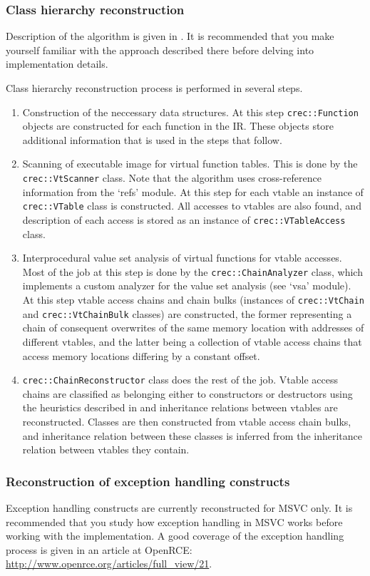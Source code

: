 \documentclass[a4paper,12pt]{article}
\newcommand{\ident}[1]{\texttt{#1}}
\begin{document}
\subsubsection{Class hierarchy reconstruction}
Description of the algorithm is given in \cite{fokin2010}. It is recommended that you make yourself familiar with the approach described there before delving into implementation details.

Class hierarchy reconstruction process is performed in several steps.
\begin{enumerate}
\item Construction of the neccessary data structures. At this step \ident{crec::Function} objects are constructed for each function in the IR. 
	These objects store additional information that is used in the steps that follow.
\item Scanning of executable image for virtual function tables. This is done by the \ident{crec::VtScanner} class. Note that the algorithm uses cross-reference information from the `refs' module. 
	At this step for each vtable an instance of \ident{crec::VTable} class is constructed. All accesses to vtables are also found, and description of each access is stored as an instance of \ident{crec::VTableAccess} class.
\item Interprocedural value set analysis of virtual functions for vtable accesses. Most of the job at this step is done by the \ident{crec::ChainAnalyzer} class, which implements a custom analyzer for the value set analysis (see `vsa' module).
	At this step vtable access chains and chain bulks (instances of \ident{crec::VtChain} and \ident{crec::VtChainBulk} classes) are constructed, 
	the former representing a chain of consequent overwrites of the same memory location with addresses of different vtables, and the latter being a collection of vtable access chains that access memory locations differing by a constant offset.
\item \ident{crec::ChainReconstructor} class does the rest of the job. 
	Vtable access chains are classified as belonging either to constructors or destructors using the heuristics described in \cite{fokin2011} and inheritance relations between vtables are reconstructed.
	Classes are then constructed from vtable access chain bulks, and inheritance relation between these classes is inferred from the inheritance relation between vtables they contain.
\end{enumerate}

\subsubsection{Reconstruction of exception handling constructs}
Exception handling constructs are currently reconstructed for MSVC only. It is recommended that you study how exception handling in MSVC works before working with the implementation. 
A good coverage of the exception handling process is given in an article at OpenRCE: \url{http://www.openrce.org/articles/full_view/21}.
\end{document}
